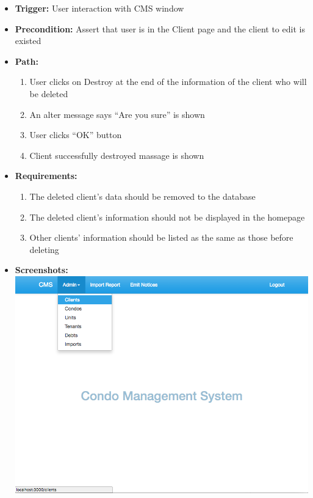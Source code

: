 \begin{itemize}
  \item[] \textbf{Trigger:} User interaction with CMS window
  \item[] \textbf{Precondition:} Assert that user is in the Client page and the client to edit is existed
  \item[] \textbf{Path:}
    \begin{enumerate}
      \item User clicks on Destroy at the end of the information of the client who will be deleted
      \item An alter message says ``Are you sure'' is shown
      \item User clicks ``OK'' button
      \item Client successfully destroyed massage is shown
    \end{enumerate}
  \item[] \textbf{Requirements:}
    \begin{enumerate}
      \item The deleted client’s data should be removed to the database
      \item The deleted client’s information should not be displayed in the homepage
      \item Other clients’ information should be listed as the same as those before deleting
    \end{enumerate}
  \item[] \textbf{Screenshots:}\\
    \includegraphics[scale=0.25]{./images/ss/client/delete/1.png}

\end{itemize}

